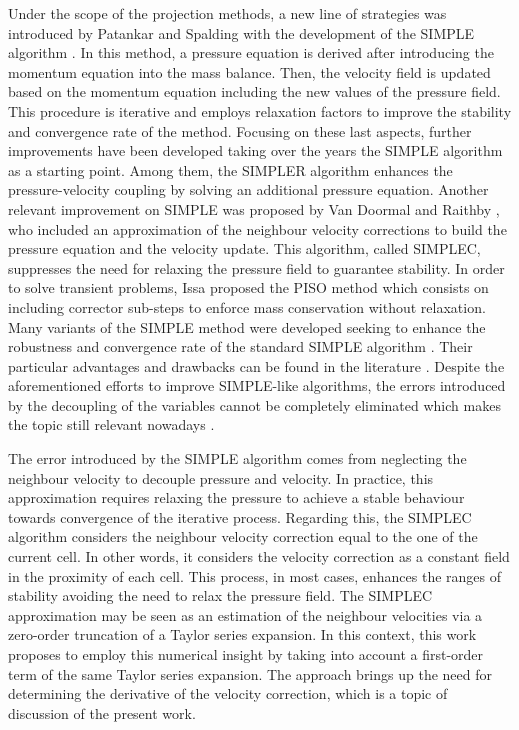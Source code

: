 \documentclass[final,3p,times,11pt,onecolumn]{myElsarticle}
\numberwithin{equation}{section}
\begin{document}
Under the scope of the projection methods, a new line of strategies was introduced by Patankar and Spalding with the development of the SIMPLE algorithm \cite{patankar1972}. In this method, a pressure equation is derived after introducing the momentum equation into the mass balance. Then, the velocity field is updated based on the momentum equation including the new values of the pressure field. This procedure is iterative and employs relaxation factors to improve the stability and convergence rate of the method. Focusing on these last aspects, further improvements have been developed taking over the years the SIMPLE algorithm as a starting
point. Among them, the SIMPLER algorithm \cite{patankar1980} enhances the pressure-velocity coupling by solving an additional pressure equation. Another relevant improvement on SIMPLE was proposed by Van Doormal and Raithby \cite{vanDoormal}, who included an approximation of the neighbour velocity corrections to build the pressure equation and the velocity update. This algorithm, called SIMPLEC, suppresses the need for relaxing the pressure field to guarantee stability. In order to solve transient problems, Issa proposed the PISO method \cite{issa,issa2} which consists on including corrector sub-steps to enforce mass conservation without relaxation. Many variants of the SIMPLE method were developed seeking to enhance the robustness and convergence rate of the standard SIMPLE algorithm \cite{tao,qu,cheng2,sun}. Their particular advantages and drawbacks can be found in the literature \cite{moukalled, liu, wang}. Despite the aforementioned efforts to improve SIMPLE-like algorithms, the errors introduced by the decoupling of the variables
cannot be completely eliminated which makes the topic still relevant nowadays \cite{li2017efficient, TUKOVIC201878, ding2017solution,xiao2018consistent, aoussou2018iterated,aguerre2018oscillation}.

The error introduced by the SIMPLE algorithm comes from neglecting the neighbour velocity to decouple pressure and velocity. 
In practice, this approximation requires relaxing the pressure to achieve a stable behaviour towards convergence of the iterative process. Regarding this, the SIMPLEC algorithm considers the neighbour velocity correction equal to the one of the current cell. In other words, it considers the velocity correction as a constant field in the proximity of each cell. This process, in most cases, enhances the ranges of stability avoiding the need to relax the pressure field. The SIMPLEC approximation may be seen as an estimation of the neighbour velocities via a zero-order truncation of a Taylor series expansion. In this context, this work proposes to employ this numerical insight by taking into account a first-order term of the same Taylor series expansion. The approach brings up the need for determining the derivative of the velocity correction, which is a topic of discussion of the present work.
\end{document}
